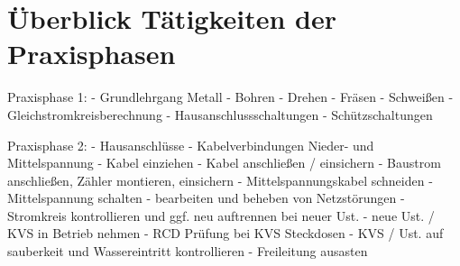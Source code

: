 \chapter*{Überblick Tätigkeiten der Praxisphasen} %

Praxisphase 1:
- Grundlehrgang Metall
- Bohren
- Drehen
- Fräsen
- Schweißen
- Gleichstromkreisberechnung
- Hausanschlussschaltungen
- Schützschaltungen

Praxisphase 2:
- Hausanschlüsse
- Kabelverbindungen Nieder- und Mittelspannung
- Kabel einziehen
- Kabel anschließen / einsichern
- Baustrom anschließen, Zähler montieren, einsichern
- Mittelspannungskabel schneiden
- Mittelspannung schalten
- bearbeiten und beheben von Netzstörungen
- Stromkreis kontrollieren und ggf. neu auftrennen bei neuer Ust.
- neue Ust. / KVS in Betrieb nehmen
- RCD Prüfung bei KVS Steckdosen
- KVS / Ust. auf sauberkeit und Wassereintritt kontrollieren
- Freileitung ausasten

\cleardoublepage
